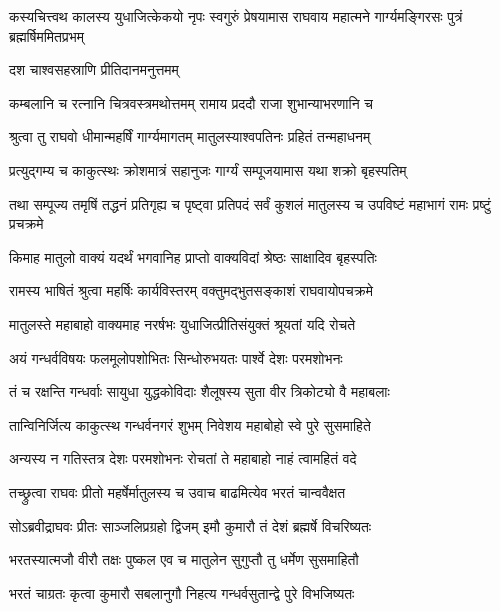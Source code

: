 
\threelineshloka
{कस्यचित्त्वथ कालस्य युधाजित्केकयो नृपः}
{स्वगुरुं प्रेषयामास राघवाय महात्मने}
{गार्ग्यमङ्गिरसः पुत्रं ब्रह्मर्षिममितप्रभम्} %

\onelineshloka
{दश चाश्वसहस्राणि प्रीतिदानमनुत्तमम्} %

\twolineshloka
{कम्बलानि च रत्नानि चित्रवस्त्रमथोत्तमम्}
{रामाय प्रददौ राजा शुभान्याभरणानि च} %

\twolineshloka
{श्रुत्वा तु राघवो धीमान्महर्षिं गार्ग्यमागतम्}
{मातुलस्याश्वपतिनः प्रहितं तन्महाधनम्} %

\twolineshloka
{प्रत्युद्गम्य च काकुत्स्थः क्रोशमात्रं सहानुजः}
{गार्ग्यं सम्पूजयामास यथा शक्रो बृहस्पतिम्} %

\threelineshloka
{तथा सम्पूज्य तमृषिं तद्धनं प्रतिगृह्य च}
{पृष्ट्वा प्रतिपदं सर्वं कुशलं मातुलस्य च}
{उपविष्टं महाभागं रामः प्रष्टुं प्रचक्रमे} %

\twolineshloka
{किमाह मातुलो वाक्यं यदर्थं भगवानिह}
{प्राप्तो वाक्यविदां श्रेष्ठः साक्षादिव बृहस्पतिः} %

\twolineshloka
{रामस्य भाषितं श्रुत्वा महर्षिः कार्यविस्तरम्}
{वक्तुमद्भुतसङ्काशं राघवायोपचक्रमे} %

\twolineshloka
{मातुलस्ते महाबाहो वाक्यमाह नरर्षभः}
{युधाजित्प्रीतिसंयुक्तं श्रूयतां यदि रोचते} %

\twolineshloka
{अयं गन्धर्वविषयः फलमूलोपशोभितः}
{सिन्धोरुभयतः पार्श्वे देशः परमशोभनः} %

\twolineshloka
{तं च रक्षन्ति गन्धर्वाः सायुधा युद्धकोविदाः}
{शैलूषस्य सुता वीर त्रिकोट्यो वै महाबलाः} %

\twolineshloka
{तान्विनिर्जित्य काकुत्स्थ गन्धर्वनगरं शुभम्}
{निवेशय महाबोहो स्वे पुरे सुसमाहिते} %

\twolineshloka
{अन्यस्य न गतिस्तत्र देशः परमशोभनः}
{रोचतां ते महाबाहो नाहं त्वामहितं वदे} %

\twolineshloka
{तच्छ्रुत्वा राघवः प्रीतो महर्षेर्मातुलस्य च}
{उवाच बाढमित्येव भरतं चान्ववैक्षत} %

\twolineshloka
{सोऽब्रवीद्राघवः प्रीतः साञ्जलिप्रग्रहो द्विजम्}
{इमौ कुमारौ तं देशं ब्रह्मर्षे विचरिष्यतः} %

\twolineshloka
{भरतस्यात्मजौ वीरौ तक्षः पुष्कल एव च}
{मातुलेन सुगुप्तौ तु धर्मेण सुसमाहितौ} %

\twolineshloka
{भरतं चाग्रतः कृत्वा कुमारौ सबलानुगौ}
{निहत्य गन्धर्वसुतान्द्वे पुरे विभजिष्यतः} %

